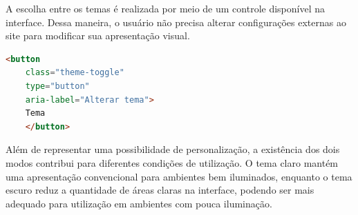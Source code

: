 A escolha entre os temas é realizada por meio de um controle disponível na interface. Dessa maneira, o usuário não precisa alterar configurações externas ao site para modificar sua apresentação visual.

\begin{lstlisting}[language=HTML, caption={Controle de alternância entre os temas.}, label={lst:themetoggle}]
	<button
	class="theme-toggle"
	type="button"
	aria-label="Alterar tema">
	Tema
	</button>
\end{lstlisting}

Além de representar uma possibilidade de personalização, a existência dos dois modos contribui para diferentes condições de utilização. O tema claro mantém uma apresentação convencional para ambientes bem iluminados, enquanto o tema escuro reduz a quantidade de áreas claras na interface, podendo ser mais adequado para utilização em ambientes com pouca iluminação.
